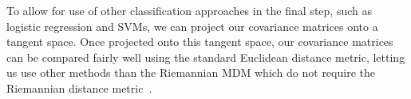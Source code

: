         To allow for use of other classification approaches in the final step, such as logistic regression and SVMs, we can project our covariance matrices onto a tangent space. Once projected onto this tangent space, our covariance matrices can be compared fairly well using the standard Euclidean distance metric, letting us use other methods than the Riemannian MDM which do not require the Riemannian distance metric~\cite{congedo_riemannian_2017}.

